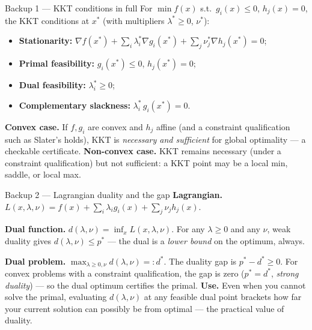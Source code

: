 \documentclass[10pt, aspectratio=169]{beamer}
\begin{document}
\begin{frame}{Backup 1 --- KKT conditions in full}
\footnotesize
For $\min f(x)$ s.t.\ $g_i(x)\le0$, $h_j(x)=0$, the KKT conditions at $x^*$ (with multipliers $\lambda^*\ge0$, $\nu^*$):
\begin{itemize}\setlength\itemsep{1pt}
\item \textbf{Stationarity:} $\nabla f(x^*) + \sum_i \lambda_i^* \nabla g_i(x^*) + \sum_j \nu_j^* \nabla h_j(x^*) = 0$;
\item \textbf{Primal feasibility:} $g_i(x^*)\le0$, $h_j(x^*)=0$;
\item \textbf{Dual feasibility:} $\lambda_i^*\ge0$;
\item \textbf{Complementary slackness:} $\lambda_i^*\, g_i(x^*) = 0$.
\end{itemize}
\medskip
\textbf{Convex case.} If $f,g_i$ are convex and $h_j$ affine (and a constraint qualification such as Slater's holds), KKT is \emph{necessary and sufficient} for global optimality --- a checkable certificate. \textbf{Non-convex case.} KKT remains necessary (under a constraint qualification) but not sufficient: a KKT point may be a local min, saddle, or local max.
\end{frame}

\begin{frame}{Backup 2 --- Lagrangian duality and the gap}
\footnotesize
\textbf{Lagrangian.} $L(x,\lambda,\nu) = f(x) + \sum_i \lambda_i g_i(x) + \sum_j \nu_j h_j(x)$.
\medskip

\textbf{Dual function.} $d(\lambda,\nu) = \inf_x L(x,\lambda,\nu)$. For any $\lambda\ge0$ and any $\nu$, weak duality gives $d(\lambda,\nu)\le p^*$ --- the dual is a \emph{lower bound} on the optimum, always.
\medskip

\textbf{Dual problem.} $\max_{\lambda\ge0,\nu} d(\lambda,\nu) =: d^*$. The \alert{duality gap} is $p^* - d^*\ge0$. For convex problems with a constraint qualification, the gap is zero ($p^*=d^*$, \emph{strong duality}) --- so the dual optimum certifies the primal.
\medskip
\textbf{Use.} Even when you cannot solve the primal, evaluating $d(\lambda,\nu)$ at any feasible dual point brackets how far your current solution can possibly be from optimal --- the practical value of duality.
\end{frame}
\end{document}
